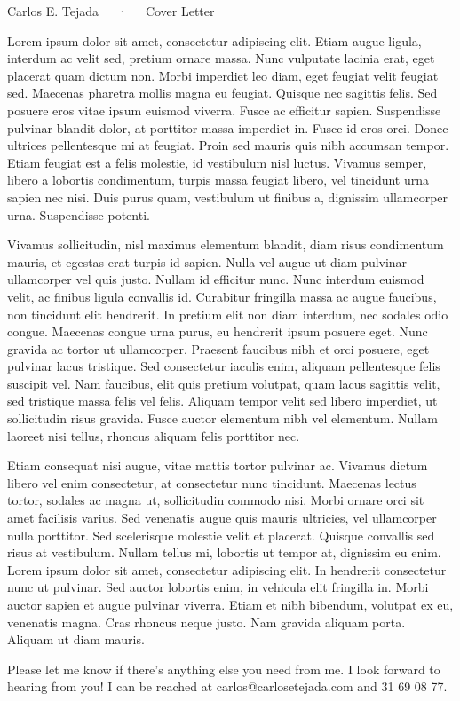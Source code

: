 \documentclass[11pt, a4paper]{awesome-cv}
\begin{document}
	\makecvheader
	\makecvfooter
		{}
		{Carlos E. Tejada~~~·~~~Cover Letter}
		{}
	
	\makelettertitle

	\begin{cvletter}
		Lorem ipsum dolor sit amet, consectetur adipiscing elit. Etiam augue ligula,
		interdum ac velit sed, pretium ornare massa. Nunc vulputate lacinia erat,
		eget placerat quam dictum non. Morbi imperdiet leo diam, eget feugiat velit
		feugiat sed. Maecenas pharetra mollis magna eu feugiat. Quisque nec sagittis
		felis. Sed posuere eros vitae ipsum euismod viverra. Fusce ac efficitur
		sapien. Suspendisse pulvinar blandit dolor, at porttitor massa imperdiet in.
		Fusce id eros orci. Donec ultrices pellentesque mi at feugiat. Proin sed
		mauris quis nibh accumsan tempor. Etiam feugiat est a felis molestie, id
		vestibulum nisl luctus. Vivamus semper, libero a lobortis condimentum,
		turpis massa feugiat libero, vel tincidunt urna sapien nec nisi. Duis purus
		quam, vestibulum ut finibus a, dignissim ullamcorper urna. Suspendisse
		potenti.

		Vivamus sollicitudin, nisl maximus elementum blandit, diam risus condimentum
		mauris, et egestas erat turpis id sapien. Nulla vel augue ut diam pulvinar
		ullamcorper vel quis justo. Nullam id efficitur nunc. Nunc interdum euismod
		velit, ac finibus ligula convallis id. Curabitur fringilla massa ac augue
		faucibus, non tincidunt elit hendrerit. In pretium elit non diam interdum,
		nec sodales odio congue. Maecenas congue urna purus, eu hendrerit ipsum
		posuere eget. Nunc gravida ac tortor ut ullamcorper. Praesent faucibus nibh
		et orci posuere, eget pulvinar lacus tristique. Sed consectetur iaculis
		enim, aliquam pellentesque felis suscipit vel. Nam faucibus, elit quis
		pretium volutpat, quam lacus sagittis velit, sed tristique massa felis vel
		felis. Aliquam tempor velit sed libero imperdiet, ut sollicitudin risus
		gravida. Fusce auctor elementum nibh vel elementum. Nullam laoreet nisi
		tellus, rhoncus aliquam felis porttitor nec.

		Etiam consequat nisi augue, vitae mattis tortor pulvinar ac. Vivamus dictum
		libero vel enim consectetur, at consectetur nunc tincidunt. Maecenas lectus
		tortor, sodales ac magna ut, sollicitudin commodo nisi. Morbi ornare orci
		sit amet facilisis varius. Sed venenatis augue quis mauris ultricies, vel
		ullamcorper nulla porttitor. Sed scelerisque molestie velit et placerat.
		Quisque convallis sed risus at vestibulum. Nullam tellus mi, lobortis ut
		tempor at, dignissim eu enim. Lorem ipsum dolor sit amet, consectetur
		adipiscing elit. In hendrerit consectetur nunc ut pulvinar. Sed auctor
		lobortis enim, in vehicula elit fringilla in. Morbi auctor sapien et augue
		pulvinar viverra. Etiam et nibh bibendum, volutpat ex eu, venenatis magna.
		Cras rhoncus neque justo. Nam gravida aliquam porta. Aliquam ut diam mauris.

		Please let me know if there's anything else you need from me. I look forward
		to hearing from you! I can be reached at carlos@carlosetejada.com and 31 69
		08 77.
	\end{cvletter}

	\makeletterclosing
\end{document}
